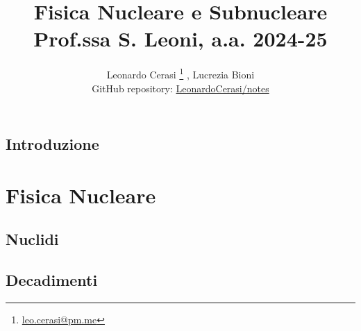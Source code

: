 \documentclass[a4paper, 12pt, openany]{book}
\author{Leonardo Cerasi%
	\thanks{\scriptsize\href{mailto:leonardo.cerasi@studenti.unimi.it}{leo.cerasi@pm.me}}%
	, Lucrezia Bioni\\
	\small GitHub repository: \href{https://github.com/LeonardoCerasi/notes}{LeonardoCerasi/notes}}
\title{\Huge\textbf{Fisica Nucleare e Subnucleare} \\ \large Prof.ssa S. Leoni, a.a. 2024-25}
\begin{document}
\frontmatter

\maketitle

\tableofcontents
\pagestyle{indice}

\mainmatter

\chapter*{Introduzione}
\pagestyle{introd}


\part{Fisica Nucleare}
\pagestyle{body}

\chapter{Nuclidi}


\chapter{Decadimenti}

\end{document}
